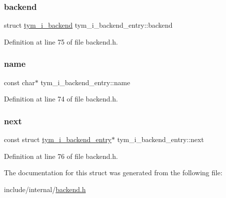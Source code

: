 \subsubsection{\texorpdfstring{backend}{backend}}
{\footnotesize\ttfamily struct \hyperlink{structtym__i__backend}{tym\+\_\+i\+\_\+backend} tym\+\_\+i\+\_\+backend\+\_\+entry\+::backend}



Definition at line 75 of file backend.\+h.

\mbox{\label{structtym__i__backend__entry_abc39107ed565fd8c35370447417eedfc}} 
\subsubsection{\texorpdfstring{name}{name}}
{\footnotesize\ttfamily const char$\ast$ tym\+\_\+i\+\_\+backend\+\_\+entry\+::name}



Definition at line 74 of file backend.\+h.

\mbox{\label{structtym__i__backend__entry_a52978e3325ccdb0f6bcf2bb98e457872}} 
\subsubsection{\texorpdfstring{next}{next}}
{\footnotesize\ttfamily const struct \hyperlink{structtym__i__backend__entry}{tym\+\_\+i\+\_\+backend\+\_\+entry}$\ast$ tym\+\_\+i\+\_\+backend\+\_\+entry\+::next}



Definition at line 76 of file backend.\+h.



The documentation for this struct was generated from the following file\+:\begin{DoxyCompactItemize}
\item 
include/internal/\hyperlink{backend_8h}{backend.\+h}\end{DoxyCompactItemize}
